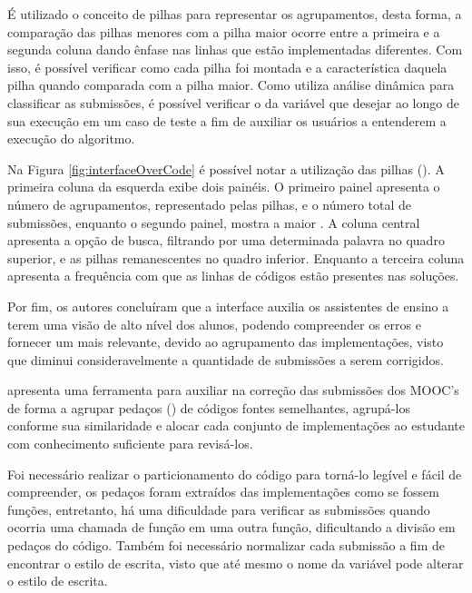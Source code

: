 	    É utilizado o conceito de pilhas para representar os agrupamentos, desta forma,
	    a comparação das pilhas menores com a pilha maior ocorre entre a primeira e a
	    segunda coluna dando ênfase nas linhas que estão implementadas diferentes. Com
	    isso, é possível verificar como cada pilha foi montada e a característica daquela
	    pilha quando comparada com a pilha maior. Como utiliza análise dinâmica para
	    classificar as submissões, é possível verificar o  da
	    variável que desejar ao longo de sua execução em um caso de teste a fim de
	    auxiliar os usuários a entenderem a execução do algoritmo.
	    
	    Na Figura \ref{fig:interfaceOverCode} é possível notar a utilização das pilhas
	    (). A primeira coluna da esquerda exibe dois painéis. O
	    primeiro painel apresenta o número de agrupamentos, representado pelas pilhas,
	    e o número total de submissões, enquanto o segundo painel, mostra a maior
	    . A coluna central apresenta a opção de busca, filtrando por
	    uma determinada palavra no quadro superior, e as pilhas remanescentes no
	    quadro inferior. Enquanto a terceira coluna apresenta a frequência com que as
	    linhas de códigos estão presentes nas soluções.
	    
	    Por fim, os autores concluíram que a interface auxilia os assistentes de
	    ensino a terem uma visão de alto nível dos alunos, podendo compreender os
	    erros e fornecer um  mais relevante, devido ao agrupamento
	    das implementações, visto que diminui consideravelmente a quantidade de
	    submissões a serem corrigidos.
	    
	     apresenta uma ferramenta para auxiliar na correção das
	    submissões dos MOOC's de forma a agrupar pedaços () de códigos
	    fontes semelhantes, agrupá-los conforme sua similaridade e alocar cada conjunto
	    de implementações ao estudante com conhecimento suficiente para revisá-los.
	    
	    Foi necessário realizar o particionamento do código para torná-lo legível
	    e fácil de compreender, os pedaços foram extraídos das implementações como
	    se fossem funções, entretanto, há uma dificuldade para verificar as submissões
	    quando ocorria uma chamada de função em uma outra função, dificultando a divisão
	    em pedaços do código. Também foi necessário normalizar cada submissão a fim de
	    encontrar o estilo de escrita, visto que até mesmo o nome da variável pode
	    alterar o estilo de escrita.
	    

